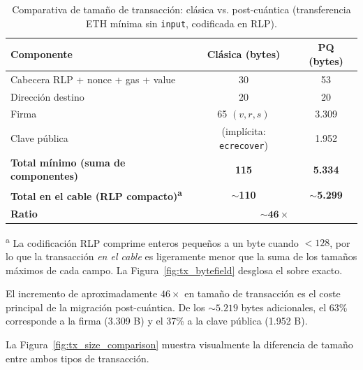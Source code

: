 \begin{table}[htbp]
\centering
\caption{Comparativa de tamaño de transacción: clásica vs. post-cuántica (transferencia ETH mínima sin \texttt{input}, codificada en RLP).}
\label{tab:tx_size}
\begin{tabular}{@{}lcc@{}}
\toprule
\textbf{Componente} & \textbf{Clásica (bytes)} & \textbf{PQ (bytes)} \\
\midrule
Cabecera RLP + nonce + gas + value & 30 & 53 \\
Dirección destino & 20 & 20 \\
Firma & 65 $(v, r, s)$ & 3.309 \\
Clave pública & (implícita: \texttt{ecrecover}) & 1.952 \\
\midrule
\textbf{Total mínimo (suma de componentes)} & \textbf{115} & \textbf{5.334} \\
\textbf{Total en el cable (RLP compacto)\textsuperscript{a}} & \textbf{$\sim$110} & \textbf{$\sim$5.299} \\
\textbf{Ratio} & \multicolumn{2}{c}{$\boldsymbol{\sim 46\times}$} \\
\bottomrule
\end{tabular}

\vspace{2pt}
\footnotesize\textsuperscript{a} La codificación RLP comprime enteros pequeños a un byte cuando $< 128$, por lo que la transacción \emph{en el cable} es ligeramente menor que la suma de los tamaños máximos de cada campo. La Figura~\ref{fig:tx_bytefield} desglosa el sobre exacto.
\end{table}

El incremento de aproximadamente $46\times$ en tamaño de transacción es el coste principal de la migración post-cuántica. De los $\sim 5.219$ bytes adicionales, el 63\% corresponde a la firma (3.309 B) y el 37\% a la clave pública (1.952 B).

La Figura~\ref{fig:tx_size_comparison} muestra visualmente la diferencia de tamaño entre ambos tipos de transacción.

